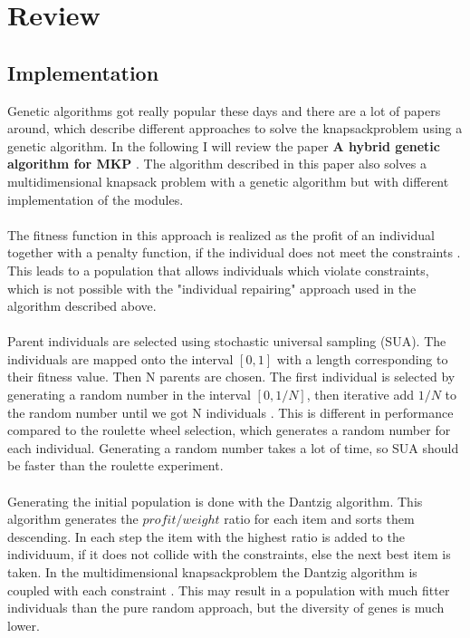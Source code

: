 \documentclass[fontsize=12pt,toc=bibliography, notitlepage]{scrreprt}
\begin{document}
\chapter{Review}
\label{chap:review}

\section{Implementation}
\label{sec:rev-impl}

Genetic algorithms got really popular these days and there are a lot of papers around, which describe different approaches to solve the knapsackproblem using a genetic algorithm. In the following I will review the paper \textbf{A hybrid genetic algorithm for MKP} \cite{bib:hybrid-ga}. The algorithm described in this paper also solves a multidimensional knapsack problem with a genetic algorithm but with different implementation of the modules. \\ \\
The fitness function in this approach is realized as the profit of an individual together with a penalty function, if the individual does not meet the constraints \cite[p. 5]{bib:hybrid-ga}. This leads to a population that allows individuals which violate constraints, which is not possible with the "individual repairing" approach used in the algorithm described above. \\ \\
Parent individuals are selected using stochastic universal sampling (SUA). The individuals are mapped onto the interval $[0,1]$ with a length corresponding to their fitness value. Then N parents are chosen. The first individual is selected by generating a random number in the interval $[0,1/N]$, then iterative add $1/N$ to the random number until we got N individuals \cite[p. 5 - 6]{bib:hybrid-ga}. This is different in performance compared to the roulette wheel selection, which generates a random number for each individual. Generating a random number takes a lot of time, so SUA should be faster than the roulette experiment. \\ \\
Generating the initial population is done with the Dantzig algorithm. This algorithm generates the $profit/weight$ ratio for each item and sorts them descending. In each step the item with the highest ratio is added to the individuum, if it does not collide with the constraints, else the next best item is taken. In the multidimensional knapsackproblem the Dantzig algorithm is coupled with each constraint \cite[p. 6 - 7]{bib:hybrid-ga}. This may result in a population with much fitter individuals than the pure random approach, but the diversity of genes is much lower. \\ \\
\end{document}
